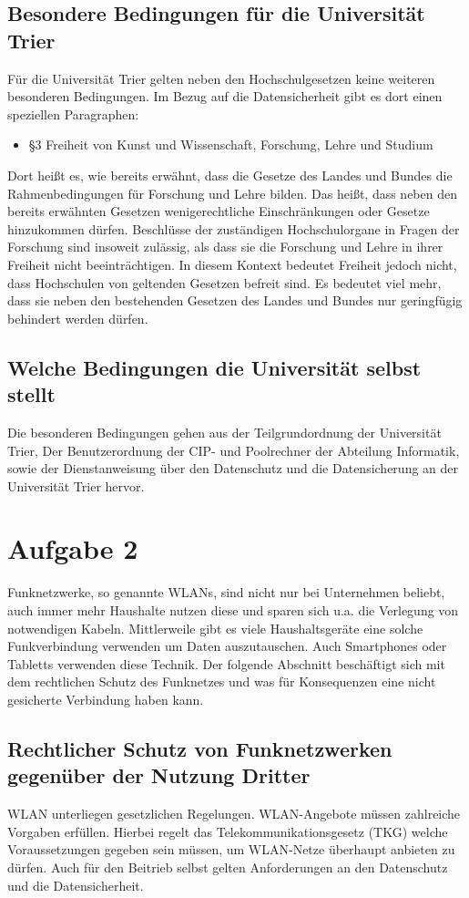 \documentclass[10pt,a4paper]{article}
\begin{document}
\subsection*{Besondere Bedingungen für die Universität Trier}
Für die Universität Trier gelten neben den Hochschulgesetzen keine weiteren besonderen Bedingungen. Im Bezug auf die Datensicherheit gibt es dort einen speziellen Paragraphen:
\begin{itemize}
	\item §3 Freiheit von Kunst und Wissenschaft, Forschung, Lehre und Studium
\end{itemize}
Dort heißt es, wie bereits erwähnt, dass die Gesetze des Landes und Bundes die Rahmenbedingungen für Forschung und Lehre bilden. Das heißt, dass neben den bereits erwähnten Gesetzen wenigerechtliche Einschränkungen oder Gesetze hinzukommen dürfen. Beschlüsse der zuständigen Hochschulorgane in Fragen der Forschung sind insoweit zulässig, als dass sie die Forschung und Lehre in ihrer Freiheit nicht beeinträchtigen. In diesem Kontext bedeutet Freiheit jedoch nicht, dass Hochschulen von geltenden Gesetzen befreit sind. Es bedeutet viel mehr, dass sie neben den bestehenden Gesetzen des Landes und Bundes nur geringfügig behindert werden dürfen.

\subsection*{Welche Bedingungen die Universität selbst stellt}
Die besonderen Bedingungen gehen aus der Teilgrundordnung der Universität Trier, Der Benutzerordnung der CIP- und Poolrechner der Abteilung Informatik, sowie der Dienstanweisung über den Datenschutz und die Datensicherung an der Universität Trier hervor.

\section*{Aufgabe 2}
Funknetzwerke, so genannte WLANs, sind nicht nur bei Unternehmen beliebt, auch immer mehr Haushalte nutzen diese und sparen sich u.a. die Verlegung von notwendigen Kabeln. Mittlerweile gibt es viele Haushaltsgeräte eine solche Funkverbindung verwenden um Daten auszutauschen. Auch Smartphones oder Tabletts verwenden diese Technik. Der folgende Abschnitt beschäftigt sich mit dem rechtlichen Schutz des Funknetzes und was für Konsequenzen eine nicht gesicherte Verbindung haben kann.

\subsection*{Rechtlicher Schutz von Funknetzwerken gegenüber der Nutzung Dritter}
WLAN unterliegen gesetzlichen Regelungen. WLAN-Angebote müssen zahlreiche Vorgaben erfüllen. Hierbei regelt das Telekommunikationsgesetz (TKG) welche Voraussetzungen gegeben sein müssen, um WLAN-Netze überhaupt anbieten zu dürfen. Auch für den Beitrieb selbst gelten Anforderungen an den Datenschutz und die Datensicherheit.~\cite{Internetrecht}
 
\end{document}
